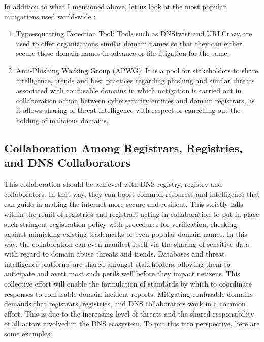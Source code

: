 In addition to what I mentioned above, let us look at the most popular mitigations used world-wide :

\begin{enumerate}
 
  \item Typo-squatting Detection Tool: Tools such as DNStwist and URLCrazy are used to offer organizations similar domain names so that they can either secure these domain names in advance or file litigation for the same.
  \item Anti-Phishing Working Group (APWG): It is a pool for stakeholders to share intelligence, trends and best practices regarding phishing and similar threats associated with confusable domains in which mitigation is carried out in collaboration action between cybersecurity entities and domain registrars, as it allows sharing of threat intelligence with respect or cancelling out the holding of malicious domains.
\end{enumerate}

\subsection{Collaboration Among Registrars, Registries, and DNS Collaborators}

This collaboration should be achieved with DNS registry, registry and collaborators. In that way, they can boost common resources and intelligence that can guide in making the internet more secure and resilient. This strictly falls within the remit of registries and registrars acting in collaboration to put in place such stringent registration policy with procedures for verification, checking against mimicking existing trademarks or even popular domain names. In this way, the collaboration can even manifest itself via the sharing of sensitive data with regard to domain abuse threats and trends. Databases and threat intelligence platforms are shared amongst stakeholders, allowing them to anticipate and avert most such perils well before they impact netizens. This collective effort will enable the formulation of standards by which to coordinate responses to confusable domain incident reports. Mitigating confusable domains demands that registrars, registries, and DNS collaborators work in a common effort. This is due to the increasing level of threats and the shared responsibility of all actors involved in the DNS ecosystem. \cite{Catania2022} To put this into perspective, here are some examples: 




